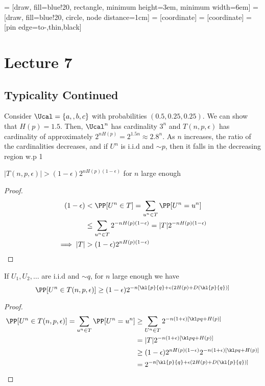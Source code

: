  = [draw, fill=blue!20, rectangle, 
    minimum height=3em, minimum width=6em]
 = [draw, fill=blue!20, circle, node distance=1cm]
 = [coordinate]
 = [coordinate]
 = [pin edge={to-,thin,black}]

\chapter{Lecture 7}
\section{Typicality Continued}
\begin{eg}
Consider $\Ucal = \{a, ,b, c\}$ with probabilities $(0.5, 0.25, 0.25)$. We can show that $H(p) = 1.5$. Then, $\Ucal^n$ has cardinality $3^n$ and $T(n, p, \epsilon)$ has cardinality of approximately $2^{nH(p)} = 2^{1.5n} \approx 2.8^n$. As $n$ increases, the ratio of the cardinalities decreases, and if $U^n$ is i.i.d and $\sim p$, then it falls in the decreasing region w.p 1
\end{eg}
\begin{corollary}
$|T(n, p, \epsilon)| > (1-\epsilon) 2^{nH(p)(1-\epsilon)}$ for $n$ large enough
\end{corollary}
\begin{proof}
\begin{align*}
    (1-\epsilon) &< \PP[U^n \in T] = \sum_{u^n \in T} \PP[U^n = u^n] \\
    &\leq \sum_{u^n \in T} 2^{-n H(p)(1-\epsilon)} = |T| 2^{-nH(p)(1-\epsilon)} \\
    \implies |T| &> (1-\epsilon)2^{nH(p)(1-\epsilon)}
\end{align*}
\end{proof}
\begin{corollary}
If $U_1, U_2, \dots$ are i.i.d and $\sim q$, for $n$ large enough we have
\[\PP[U^n \in T(n, p, \epsilon)] \geq (1-\epsilon) 2^{-n[\kl{p}{q} + \epsilon(2H(p) + D(\kl{p}{q})]} \]
\end{corollary}
\begin{proof}
\begin{align*}
    \PP[U^n \in T(n, p, \epsilon)] = \sum_{u^n \in T} \PP[U^n = u^n] &\geq \sum_{U^n \in T} 2^{-n(1+\epsilon)[\kl pq + H(p)]} \\
    &= |T| 2^{-n(1+\epsilon)[\kl pq + H(p)]} \\
    &\geq (1-\epsilon) 2^{nH(p) (1-\epsilon)} 2^{-n(1+\epsilon)[\kl pq + H(p)]} \\
    &= 2^{-n[\kl{p}{q} + \epsilon(2H(p) + D(\kl{p}{q})]}
\end{align*}
\end{proof}
